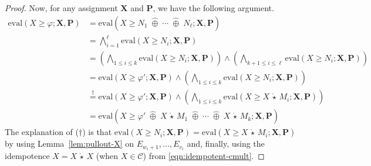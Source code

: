 \documentclass[10pt]{amsart}
\theoremstyle{plain}
\theoremstyle{definition}
\providecommand{\cC}[0]{\ensuremath{\mathcal C}\xspace}
\providecommand{\bP}[0]{\ensuremath{\mathbf P}\xspace}
\providecommand{\bX}[0]{\ensuremath{\mathbf X}\xspace}
\let\leq\leqslant
\let\geq\geqslant
\providecommand{\cplus}[0]{\ensuremath{\hat{\oplus}}\xspace}
\providecommand{\cmult}[0]{\ensuremath{{\,\mathring{\star}\,}}\xspace}
\providecommand{\convset}[0]{\ensuremath{\cC}\xspace}
\providecommand{\evalmap}[0]{\ensuremath{\mathrm{eval}}\xspace}
\begin{document}
\begin{proof}
    Now, for any assignment $\bX$ and $\bP$, we have the following argument.
    \begin{align*}
        \evalmap\left(X \geq \varphi ; \bX,\bP \right) &= 
            \evalmap\left(X \geq N_1 \;\cplus\; \dotsi \;\cplus\; N_\ell ; \bX,\bP\right)\\
            &= \mathop{\bigwedge}_{i=1}^\ell \evalmap\left(X \geq N_i ; \bX,\bP\right) \\
            &= \left(\mathop{\bigwedge}_{1\leq i\leq k} \evalmap\left(X \geq N_i ; \bX,\bP\right)\right) 
                \wedge \left(\mathop{\bigwedge}_{k+1\leq i\leq \ell} \evalmap\left(X \geq N_i ; \bX,\bP\right)\right)\\
            &= \evalmap\left(X \geq \varphi' ; \bX,\bP\right) \wedge \left(\mathop{\bigwedge}_{1\leq i\leq k} \evalmap\left(X \geq N_i ; \bX,\bP\right)\right)\\
            &\stackrel{\dagger}{=} \evalmap\left(X \geq \varphi' ; \bX,\bP\right) \wedge \left(\mathop{\bigwedge}_{1\leq i\leq k} \evalmap\left(X \geq X\cmult M_i ; \bX,\bP\right)\right)\\
            &= \evalmap\left(X \geq \varphi' \;\cplus\; X\cmult M_1 \;\cplus\; \dotsi \;\cplus\; X\cmult M_k ; \bX,\bP\right)
    \end{align*}
    The explanation of ($\dagger$) is that $\evalmap\left(X \geq N_i ; \bX,\bP\right) = \evalmap\left(X \geq X\cmult M_i ; \bX,\bP\right) $ by using Lemma~\ref{lem:pullout-X} on 
    $E_{w_i+1}, \dotsc, E_{v_i}$
    and, finally, using the idempotence $X=X\cmult X$ (when $X\in \convset$) from \eqref{eqn:idempotent-cmult}. 
\end{proof}
\end{document}
